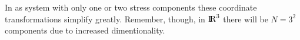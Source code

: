 In as system with only one or two stress components these coordinate transformations simplify greatly. Remember, though, in ${\rm I\!R}^3$ there will be $N = 3^2$ components due to increased dimentionality.
		

